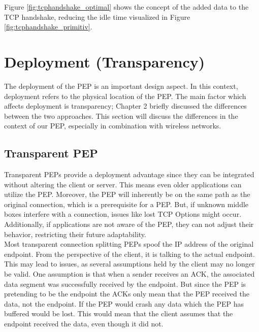 \documentclass[a4paper,english, 12pt]{report}
\begin{document}
Figure \ref{fig:tcphandshake_optimal} shows the concept of the added data to the TCP handshake, reducing the idle time visualized in Figure \ref{fig:tcphandshake_primitiv}. 


\section{Deployment (Transparency)}
The deployment of the PEP is an important design aspect. In this context, deployment refers to the physical location of the PEP. The main factor which affects deployment is transparency; Chapter 2 briefly discussed the differences between the two approaches. This section will discuss the differences in the context of our PEP, especially in combination with wireless networks.

\subsection{Transparent PEP}
Transparent PEPs provide a deployment advantage since they can be integrated without altering the client or server. This means even older applications can utilize the PEP. Moreover, the PEP will inherently be on the same path as the original connection, which is a prerequisite for a PEP. But, if unknown middle boxes interfere with a connection, issues like lost TCP Options might occur. Additionally, if applications are not aware of the PEP, they can not adjust their behavior, restricting their future adaptability.\\

Most transparent connection splitting PEPs spoof the IP address of the original endpoint. From the perspective of the client, it is talking to the actual endpoint. This may lead to issues, as several assumptions held by the client may no longer be valid. One assumption is that when a sender receives an ACK, the associated data segment was successfully received by the endpoint. But since the PEP is pretending to be the endpoint the ACKs only mean that the PEP received the data, not the endpoint. If the PEP would crash any data which the PEP has buffered would be lost. This would mean that the client assumes that the endpoint received the data, even though it did not.
\end{document}
